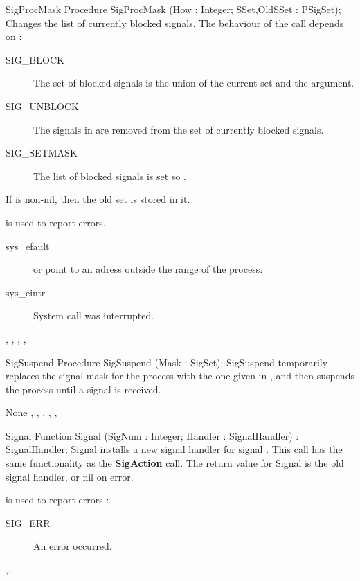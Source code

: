 \begin{procedure}{SigProcMask}
\Declaration
Procedure SigProcMask (How : Integer; SSet,OldSSet : PSigSet);
\Description
Changes the list of currently blocked signals. The behaviour of the call
depends on  :
\begin{description}
\item[SIG\_BLOCK] The set of blocked signals is the union of the current set
and the  argument.
\item[SIG\_UNBLOCK] The signals in  are removed from the set of
currently blocked signals.
\item[SIG\_SETMASK] The list of blocked signals is set so .
\end{description}
If  is non-nil, then the old set is stored in it.

\Errors
{} is used to report errors.
\begin{description}
\item[sys\_efault]  or  point to an adress outside
the range of the process.
\item[sys\_eintr] System call was interrupted.
\end{description}

\SeeAlso
{}, , , ,
\end{procedure}

\begin{procedure}{SigSuspend}
\Declaration
Procedure SigSuspend (Mask : SigSet);
\Description
SigSuspend temporarily replaces the signal mask for the process with the one
given in , and then suspends the process until a signal is received.

\Errors
None
\SeeAlso
{}, , , ,
,  
\end{procedure}

\begin{function}{Signal}
\Declaration
Function Signal (SigNum : Integer; Handler : SignalHandler) : SignalHandler;
\Description
Signal installs a new signal handler for signal . This call has
the same functionality as the \textbf{SigAction} call.
The return value for Signal is the old signal handler, or nil on error.

\Errors
{} is used to report errors :
\begin{description}
\item[SIG\_ERR] An error occurred.
\end{description}

\SeeAlso
{},,  
\end{function}

